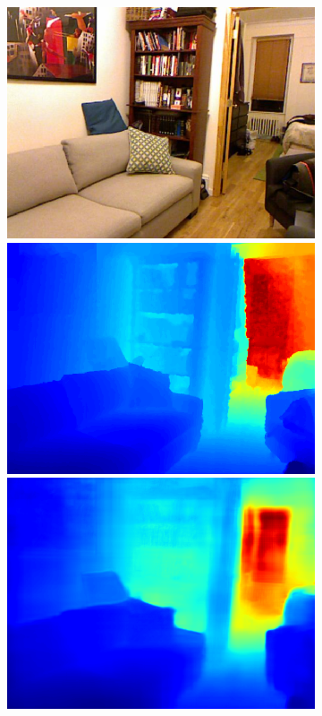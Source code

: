 \begin{figure}[htb]
\begin{subfigure}{0.15\linewidth}
  \begin{minipage}[t]{1\linewidth}
  \centering
  \includegraphics[width=1\linewidth]{figure/nyu_rgb/170.png}
  \includegraphics[width=1\linewidth]{figure/nyu_gt/170.png}
  \includegraphics[width=1\linewidth]{figure/nyu_result/bedroom_rgb_00170.png}

\end{minipage}
\end{subfigure}
\end{figure}
